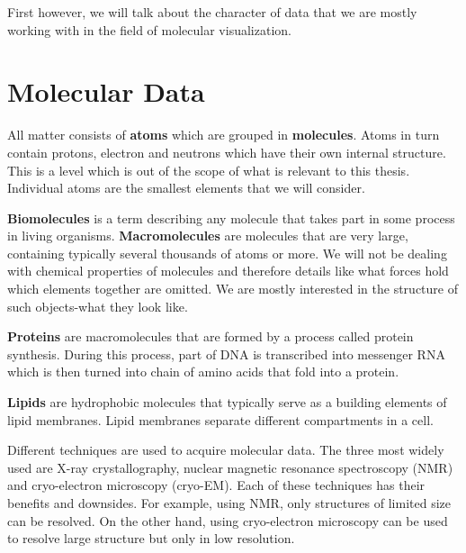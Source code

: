 \documentclass[
  digital, %
  table,   %
  nolof,     %
  nolot,     %
]{fithesis3}
\begin{document}
First however, we will talk about the character of data that we are mostly working with in the field of molecular visualization.


\section{Molecular Data}
All matter consists of \textbf{atoms} which are grouped in \textbf{molecules}. Atoms in turn contain protons, electron and neutrons which have their own internal structure. This is a level which is out of the scope of what is relevant to this thesis. Individual atoms are the smallest elements that we will consider.

\textbf{Biomolecules} is a term describing any molecule that takes part in some process in living organisms. \textbf{Macromolecules} are molecules that are very large, containing typically several thousands of atoms or more. We will not be dealing with chemical properties of molecules and therefore details like what forces hold which elements together are omitted. We are mostly interested in the structure of such objects-what they look like.

\textbf{Proteins} are macromolecules that are formed by a process called protein synthesis. During this process, part of DNA is transcribed into messenger RNA which is then turned into chain of amino acids that fold into a protein.

\textbf{Lipids} are hydrophobic molecules that typically serve as a building elements of lipid membranes. Lipid membranes separate different compartments in a cell.

Different techniques are used to acquire molecular data. The three most widely used are X-ray crystallography, nuclear magnetic resonance spectroscopy (NMR) and cryo-electron microscopy (cryo-EM). Each of these techniques has their benefits and downsides. For example, using NMR, only structures of limited size can be resolved. On the other hand, using cryo-electron microscopy can be used to resolve large structure but only in low resolution.
\end{document}
